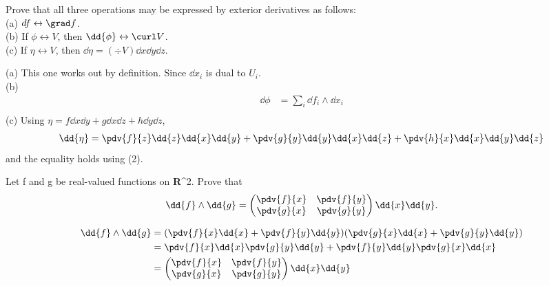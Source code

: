 \begin{problem}{8}
  Prove that all three operations may be expressed by exterior derivatives as follows: \\
  (a) \(df \leftrightarrow \grad f\).\\
  (b) If \(\phi\leftrightarrow V\), then \(\dd{\phi}\leftrightarrow\curl V\).\\
  (c) If \(\eta\leftrightarrow V\), then \(\dd{\eta}=(\div V)\dd{x}\dd{y}\dd{z}\).
\end{problem}
\begin{sol}
  (a) This one works out by definition. Since \(\dd{x_i}\) is dual to \(U_i\).\\
  (b) \begin{align}
    \dd{\phi}&=\sum_i \dd{f_i}\wedge \dd{x_i}\\
  \end{align}
  (c) Using \(\eta=f\dd{x}\dd{y}+g\dd{x}\dd{z}+h\dd{y}\dd{z}\),
  \begin{align}
    \dd{\eta}&=\pdv{f}{z}\dd{z}\dd{x}\dd{y}+\pdv{g}{y}\dd{y}\dd{x}\dd{z}+\pdv{h}{x}\dd{x}\dd{y}\dd{z}\\
  \end{align}
  and the equality holds using (2).
\end{sol}

\begin{problem}{9}
  Let f and g be real-valued functions on \textbf{R}^2. Prove that
  \begin{equation}
    \dd{f}\wedge \dd{g}= \begin{pmatrix}\pdv{f}{x}&\pdv{f}{y}\\\pdv{g}{x}&\pdv{g}{y}\end{pmatrix}\dd{x}\dd{y}.
  \end{equation}
\end{problem}
\begin{sol}
  \begin{align}
    \dd{f}\wedge \dd{g}&=(\pdv{f}{x}\dd{x}+\pdv{f}{y}\dd{y})(\pdv{g}{x}\dd{x}+\pdv{g}{y}\dd{y})\\
    &=\pdv{f}{x}\dd{x}\pdv{g}{y}\dd{y}+\pdv{f}{y}\dd{y}\pdv{g}{x}\dd{x}\\
    &=\begin{pmatrix}\pdv{f}{x}&\pdv{f}{y}\\\pdv{g}{x}&\pdv{g}{y}\end{pmatrix}\dd{x}\dd{y}
  \end{align}
\end{sol}
